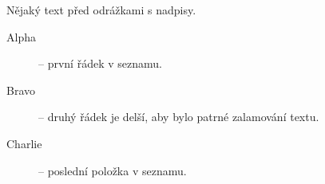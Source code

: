\documentclass[10pt, a4paper]{article}
\begin{document}
\parbox{0.5\textwidth}
{
Nějaký text před odrážkami s nadpisy.
\begin{description}
   \item[Alpha] -- první řádek v seznamu.
   \item[Bravo] -- druhý řádek je delší, aby bylo
     patrné zalamování textu.
   \item[Charlie] -- poslední položka v seznamu.
\end{description}
}
\end{document}
